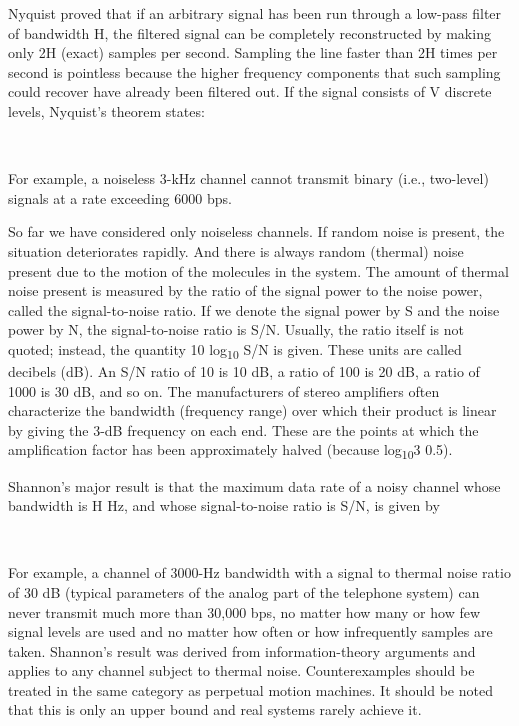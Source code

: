 Nyquist proved that if an arbitrary signal has been run through a
low-pass filter of bandwidth {H}, the filtered signal can be completely
reconstructed by making only 2{H} (exact) samples per second. Sampling
the line faster than 2{H} times per second is pointless because the
higher frequency components that such sampling could recover have
already been filtered out. If the signal consists of {V} discrete
levels, Nyquist's theorem states:


~

For example, a noiseless 3-kHz channel cannot transmit binary (i.e.,
two-level) signals at a rate exceeding 6000 bps.

So far we have considered only noiseless channels. If random noise is
present, the situation deteriorates rapidly. And there is always random
(thermal) noise present due to the motion of the molecules in the
system. The amount of thermal noise present is measured by the ratio of
the signal power to the noise power, called the {signal-to-noise ratio}.
If we denote the signal power by {S} and the noise power by {N}, the
signal-to-noise ratio is {S/N}. Usually, the ratio itself is not quoted;
instead, the quantity 10 log\textsubscript{10} {S/N} is given. These
units are called {decibels} (dB). An {S/N} ratio of 10 is 10 dB, a ratio
of 100 is 20 dB, a ratio of 1000 is 30 dB, and so on. The manufacturers
of stereo amplifiers often characterize the bandwidth (frequency range)
over which their product is linear by giving the 3-dB frequency on each
end. These are the points at which the amplification factor has been
approximately halved (because log\textsubscript{10}3
 0.5).

Shannon's major result is that the maximum data rate of a noisy channel
whose bandwidth is {H} Hz, and whose signal-to-noise ratio is {S/N}, is
given by


~

For example, a channel of 3000-Hz bandwidth with a signal to thermal
noise ratio of 30 dB (typical parameters of the analog part of the
telephone system) can never transmit much more than 30,000 bps, no
matter how many or how few signal levels are used and no matter how
often or how infrequently samples are taken. Shannon's result was
derived from information-theory arguments and applies to any channel
subject to thermal noise. Counterexamples should be treated in the same
category as perpetual motion machines. It should be noted that this is
only an upper bound and real systems rarely achieve it.

